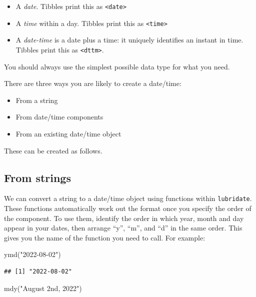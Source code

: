 \documentclass[
]{book}
\newenvironment{Shaded}{\begin{snugshade}}{\end{snugshade}}
\newcommand{\FunctionTok}[1]{\textcolor[rgb]{0.00,0.00,0.00}{#1}}
\newcommand{\NormalTok}[1]{#1}
\newcommand{\StringTok}[1]{\textcolor[rgb]{0.31,0.60,0.02}{#1}}
\providecommand{\tightlist}{%
  \setlength{\itemsep}{0pt}\setlength{\parskip}{0pt}}
\begin{document}
\begin{itemize}
\tightlist
\item
  A \emph{date}. Tibbles print this as \texttt{\textless{}date\textgreater{}}
\item
  A \emph{time} within a day. Tibbles print this as \texttt{\textless{}time\textgreater{}}
\item
  A \emph{date-time} is a date plus a time: it uniquely identifies an instant in time. Tibbles print this as \texttt{\textless{}dttm\textgreater{}}.
\end{itemize}

You should always use the simplest possible data type for what you need.

There are three ways you are likely to create a date/time:

\begin{itemize}
\tightlist
\item
  From a string
\item
  From date/time components
\item
  From an existing date/time object
\end{itemize}

These can be created as follows.

\hypertarget{from-strings}{%
\subsection{From strings}\label{from-strings}}

We can convert a string to a date/time object using functions within \texttt{lubridate}. These functions automatically work out the format once you specify the order of the component. To use them, identify the order in which year, month and day appear in your dates, then arrange ``y'', ``m'', and ``d'' in the same order. This gives you the name of the function you need to call. For example:

\begin{Shaded}
\begin{Highlighting}[]
\FunctionTok{ymd}\NormalTok{(}\StringTok{"2022{-}08{-}02"}\NormalTok{)}
\end{Highlighting}
\end{Shaded}

\begin{verbatim}
## [1] "2022-08-02"
\end{verbatim}

\begin{Shaded}
\begin{Highlighting}[]
\FunctionTok{mdy}\NormalTok{(}\StringTok{"August 2nd, 2022"}\NormalTok{)}
\end{Highlighting}
\end{Shaded}
\end{document}
